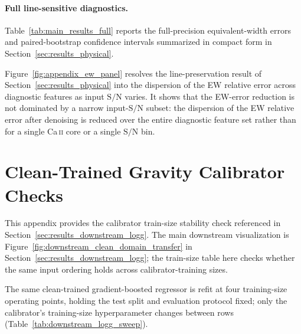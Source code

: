 \documentclass[twocolumn]{aastex7}
\newcommand{\SNR}{\mathrm{S}/\mathrm{N}}
\newcounter{protocol}
\begin{document}
\paragraph{Full line-sensitive diagnostics.}
Table~\ref{tab:main_results_full} reports the full-precision equivalent-width errors and paired-bootstrap confidence intervals summarized in compact form in Section~\ref{sec:results_physical}.

Figure~\ref{fig:appendix_ew_panel} resolves the line-preservation result of Section~\ref{sec:results_physical} into the dispersion of the EW relative error across diagnostic features as input $\SNR$ varies. It shows that the EW-error reduction is not dominated by a narrow input-$\SNR$ subset: the dispersion of the EW relative error after denoising is reduced over the entire diagnostic feature set rather than for a single Ca\,\textsc{ii} core or a single $\SNR$ bin.

\section{Clean-Trained Gravity Calibrator Checks}
\label{app:downstream_logg}

This appendix provides the calibrator train-size stability check referenced in Section~\ref{sec:results_downstream_logg}. The main downstream visualization is Figure~\ref{fig:downstream_clean_domain_transfer} in Section~\ref{sec:results_downstream_logg}; the train-size table here checks whether the same input ordering holds across calibrator-training sizes.

The same clean-trained gradient-boosted regressor is refit at four training-size operating points, holding the test split and evaluation protocol fixed; only the calibrator's training-size hyperparameter changes between rows (Table~\ref{tab:downstream_logg_sweep}).
\end{document}
